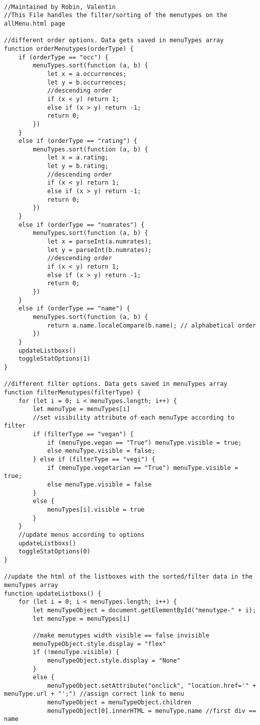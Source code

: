 \begin{lstlisting}

//Maintained by Robin, Valentin
//This File handles the filter/sorting of the menutypes on the allMenu.html page

//different order options. Data gets saved in menuTypes array
function orderMenutypes(orderType) {
    if (orderType == "occ") {
        menuTypes.sort(function (a, b) {
            let x = a.occurrences;
            let y = b.occurrences;
            //descending order
            if (x < y) return 1;
            else if (x > y) return -1;
            return 0;
        })
    }
    else if (orderType == "rating") {
        menuTypes.sort(function (a, b) {
            let x = a.rating;
            let y = b.rating;
            //descending order
            if (x < y) return 1;
            else if (x > y) return -1;
            return 0;
        })
    }
    else if (orderType == "numrates") {
        menuTypes.sort(function (a, b) {
            let x = parseInt(a.numrates);
            let y = parseInt(b.numrates);
            //descending order
            if (x < y) return 1;
            else if (x > y) return -1;
            return 0;
        })
    }
    else if (orderType == "name") {
        menuTypes.sort(function (a, b) {
            return a.name.localeCompare(b.name); // alphabetical order
        })
    }
    updateListboxs()
    toggleStatOptions(1)
}

//different filter options. Data gets saved in menuTypes array
function filterMenutypes(filterType) {
    for (let i = 0; i < menuTypes.length; i++) {
        let menuType = menuTypes[i]
        //set visibility attribute of each menuType according to filter
        if (filterType == "vegan") {
            if (menuType.vegan == "True") menuType.visible = true;
            else menuType.visible = false;
        } else if (filterType == "vegi") {
            if (menuType.vegetarian == "True") menuType.visible = true;
            else menuType.visible = false
        }
        else {
            menuTypes[i].visible = true
        }
    }
    //update menus according to options
    updateListboxs()
    toggleStatOptions(0)
}

//update the html of the listboxes with the sorted/filter data in the menuTypes array
function updateListboxs() {
    for (let i = 0; i < menuTypes.length; i++) {
        let menuTypeObject = document.getElementById("menutype-" + i);
        let menuType = menuTypes[i]

        //make menutypes width visible == false invisible
        menuTypeObject.style.display = "flex"
        if (!menuType.visible) {
            menuTypeObject.style.display = "None"
        }
        else {
            menuTypeObject.setAttribute("onclick", "location.href='" + menuType.url + "';") //assign correct link to menu
            menuTypeObject = menuTypeObject.children
            menuTypeObject[0].innerHTML = menuType.name //first div == name
            

\end{lstlisting}
